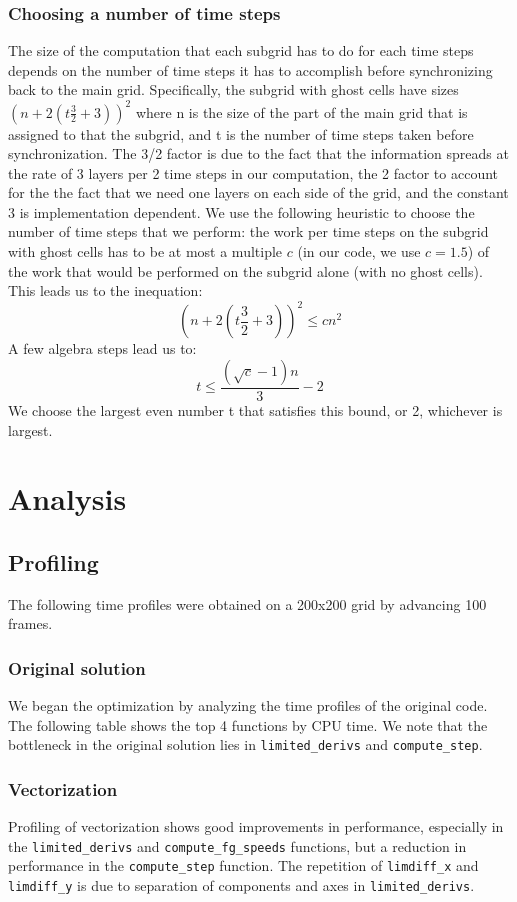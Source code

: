 \documentclass[11pt]{article}
\begin{document}
\subsubsection{Choosing a number of time steps}
The size of the computation that each subgrid has to do for each time steps depends on the number of time steps it has to accomplish before synchronizing back to the main grid. Specifically, the subgrid with ghost cells have sizes
$(n+2(t\frac{3}{2}+3))^2$ where n is the size of the part of the main grid that is assigned to that the subgrid, and t is the number of time steps taken before synchronization. The 3/2 factor is due to the fact that the information spreads at the rate of 3 layers per 2 time steps in our computation, the 2 factor to account for the the fact that we need one layers on each side of the grid, and the constant 3 is implementation dependent. We use the following heuristic to choose the number of time steps that we perform: the work per time steps on the subgrid with ghost cells has to be at most a multiple $c$ (in our code, we use $c=1.5$) of the work that would be performed on the subgrid alone (with no ghost cells). This leads us to the inequation:
$$ (n+2(t\frac{3}{2}+3))^2 \leq c n^2$$
A few algebra steps lead us to:
$$ t \leq \frac{(\sqrt c-1)n}{3}-2$$
We choose the largest even number t that satisfies this bound, or 2, whichever is largest.
 

\section{Analysis}
\subsection{Profiling} \label{sec:prof}

The following time profiles were obtained on a 200x200 grid by advancing 100 frames. 

\subsubsection{Original solution}
We began the optimization by analyzing the time profiles of the original code. The following table shows the top 4 functions by CPU time. We note that the bottleneck in the original solution lies in \texttt{limited\_derivs} and \texttt{compute\_step}.


\subsubsection{Vectorization}
Profiling of vectorization shows good improvements in performance, especially in the \texttt{limited\_derivs} and \texttt{compute\_fg\_speeds} functions, but a reduction in performance in the \texttt{compute\_step} function. The repetition of \texttt{limdiff\_x} and \texttt{limdiff\_y} is due to separation of components and axes in \texttt{limited\_derivs}. 

\end{document}
